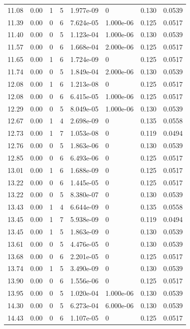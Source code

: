 \documentclass[preview]{standalone}
\begin{document}
{{{\begin{tabular}{L{1.2cm}C{1.2cm} C{0.3cm}C{0.5cm} C{1.4cm}C{1.4cm} C{1.4cm}C{1.4cm}}
  11.08  &  0.00  & 1     &  5 &  1.977e-09  & 0  & 0.130 &  0.0539   \\ 
  11.39  &  0.00  & 0     &  6 &  7.624e-05  & 1.000e-06  & 0.125 &  0.0517   \\ 
  11.40  &  0.00  & 0     &  5 &  1.123e-04  & 1.000e-06  & 0.130 &  0.0539   \\ 
  11.57  &  0.00  & 0     &  6 &  1.668e-04  & 2.000e-06  & 0.125 &  0.0517   \\ 
  11.65  &  0.00  & 1     &  6 &  1.724e-09  & 0  & 0.125 &  0.0517   \\ 
  11.74  &  0.00  & 0     &  5 &  1.849e-04  & 2.000e-06  & 0.130 &  0.0539   \\ 
  12.08  &  0.00  & 1     &  6 &  1.213e-08  & 0  & 0.125 &  0.0517   \\ 
  12.08  &  0.00  & 0     &  6 &  6.415e-05  & 1.000e-06  & 0.125 &  0.0517   \\ 
  12.29  &  0.00  & 0     &  5 &  8.049e-05  & 1.000e-06  & 0.130 &  0.0539   \\ 
  12.67  &  0.00  & 1     &  4 &  2.698e-09  & 0  & 0.135 &  0.0558   \\ 
  12.73  &  0.00  & 1     &  7 &  1.053e-08  & 0  & 0.119 &  0.0494   \\ 
  12.76  &  0.00  & 0     &  5 &  1.863e-06  & 0  & 0.130 &  0.0539   \\ 
  12.85  &  0.00  & 0     &  6 &  6.493e-06  & 0  & 0.125 &  0.0517   \\ 
  13.01  &  0.00  & 1     &  6 &  1.688e-09  & 0  & 0.125 &  0.0517   \\ 
  13.22  &  0.00  & 0     &  6 &  1.445e-05  & 0  & 0.125 &  0.0517   \\ 
  13.22  &  0.00  & 0     &  5 &  8.380e-07  & 0  & 0.130 &  0.0539   \\ 
  13.43  &  0.00  & 1     &  4 &  6.644e-09  & 0  & 0.135 &  0.0558   \\ 
  13.45  &  0.00  & 1     &  7 &  5.938e-09  & 0  & 0.119 &  0.0494   \\ 
  13.45  &  0.00  & 1     &  5 &  1.863e-09  & 0  & 0.130 &  0.0539   \\ 
  13.61  &  0.00  & 0     &  5 &  4.476e-05  & 0  & 0.130 &  0.0539   \\ 
  13.68  &  0.00  & 0     &  6 &  2.201e-05  & 0  & 0.125 &  0.0517   \\ 
  13.74  &  0.00  & 1     &  5 &  3.490e-09  & 0  & 0.130 &  0.0539   \\ 
  13.90  &  0.00  & 0     &  6 &  1.556e-06  & 0  & 0.125 &  0.0517   \\ 
  13.95  &  0.00  & 0     &  5 &  1.020e-04  & 1.000e-06  & 0.130 &  0.0539   \\ 
  14.30  &  0.00  & 0     &  5 &  6.273e-04  & 6.000e-06  & 0.130 &  0.0539   \\ 
  14.43  &  0.00  & 0     &  6 &  1.107e-05  & 0  & 0.125 &  0.0517   \\ 
\hline 
\end{tabular} 

}}}
\end{document}
